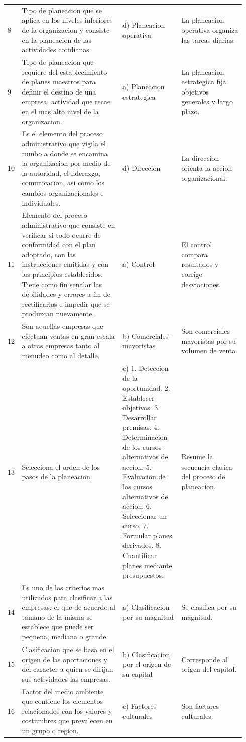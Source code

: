 \documentclass[
	spanish,
	letterpaper, oneside
]{article}
\begin{document}
\begin{landscape}
\begin{longtable}{@{}L{0.03\linewidth}L{0.41\linewidth}L{0.24\linewidth}L{0.26\linewidth}@{}}
8 & Tipo de planeacion que se aplica en los niveles inferiores de la organizacion y consiste en la planeacion de las actividades cotidianas. & d) Planeacion operativa & La planeacion operativa organiza las tareas diarias. \\
9 & Tipo de planeacion que requiere del establecimiento de planes maestros para definir el destino de una empresa, actividad que recae en el mas alto nivel de la organizacion. & a) Planeacion estrategica & La planeacion estrategica fija objetivos generales y largo plazo. \\
10 & Es el elemento del proceso administrativo que vigila el rumbo a donde se encamina la organizacion por medio de la autoridad, el liderazgo, comunicacion, asi como los cambios organizacionales e individuales. & d) Direccion & La direccion orienta la accion organizacional. \\
11 & Elemento del proceso administrativo que consiste en verificar si todo ocurre de conformidad con el plan adoptado, con las instrucciones emitidas y con los principios establecidos. Tiene como fin senalar las debilidades y errores a fin de rectificarlos e impedir que se produzcan nuevamente. & a) Control & El control compara resultados y corrige desviaciones. \\
12 & Son aquellas empresas que efectuan ventas en gran escala a otras empresas tanto al menudeo como al detalle. & b) Comerciales-mayoristas & Son comerciales mayoristas por su volumen de venta. \\
13 & Selecciona el orden de los pasos de la planeacion. & c) 1. Deteccion de la oportunidad. 2. Establecer objetivos. 3. Desarrollar premisas. 4. Determinacion de los cursos alternativos de accion. 5. Evaluacion de los cursos alternativos de accion. 6. Seleccionar un curso. 7. Formular planes derivados. 8. Cuantificar planes mediante presupuestos. & Resume la secuencia clasica del proceso de planeacion. \\
14 & Es uno de los criterios mas utilizados para clasificar a las empresas, el que de acuerdo al tamano de la misma se establece que puede ser pequena, mediana o grande. & a) Clasificacion por su magnitud & Se clasifica por su magnitud. \\
15 & Clasificacion que se basa en el origen de las aportaciones y del caracter a quien se dirijan sus actividades las empresas. & b) Clasificacion por el origen de su capital & Corresponde al origen del capital. \\
16 & Factor del medio ambiente que contiene los elementos relacionados con los valores y costumbres que prevalecen en un grupo o region. & c) Factores culturales & Son factores culturales. \\

\end{longtable}
\end{landscape}
\end{document}
